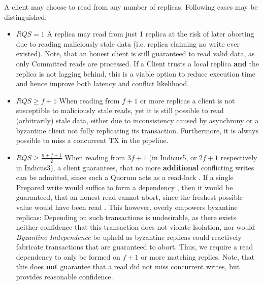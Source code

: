 A client may choose to read from any number of replicas. Following cases may be distinguished:
\begin{itemize}
\item \textbf{$RQS = 1$} A replica may read from just 1 replica at the risk of later aborting due to reading maliciously stale data (i.e. replica claiming no write ever existed). Note, that an honest client is still guaranteed to read valid data, as only Committed reads are processed. If a Client trusts a local replica \textbf{and} the replica is not lagging behind, this is a viable option to reduce execution time and hence improve both latency and conflict likelihood.
\item \textbf{$RQS \geq f+1$} When reading from $f+1$ or more replicas a client is not susceptible to maliciously stale reads, yet it is still possible to read (arbitrarily) stale data, either due to inconsistency caused by asynchrony or a byzantine client not fully replicating its transaction. Furthermore, it is always possible to miss a concurrent TX in the pipeline.
\item \textbf{$RQS \geq \frac{n+f+1}{2}$} When reading from $3f+1$ (in Indicus5, or $2f+1$ respectively in Indicus3), a client guarantees, that no more \textbf{additional}  conflicting writes can be admitted, since such a Quorum acts as a read-lock . If a single Prepared write would suffice to form a dependency , then it would be guaranteed, that an honest read cannot abort, since the freshest possible value would have been read . This however, overly empowers byzantine replicas:  Depending on such transactions is undesirable, as there exists neither confidence that this transaction does not violate Isolation, nor would \textit{Byzantine Independence} be upheld as byzantine replicas could reactively fabricate transactions that are guaranteed to abort. Thus, we require a read dependency to only be formed on $f+1$ or more matching replies. Note, that this does \textbf{not} guarantee that a read did not miss concurrent writes, but provides reasonable confidence.

\end{itemize}


